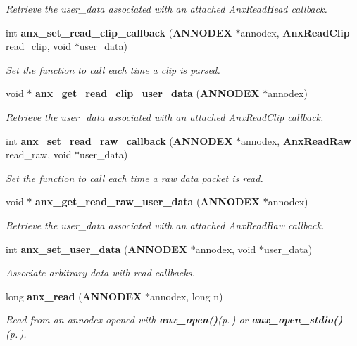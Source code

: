 \begin{CompactItemize}
\begin{CompactList}\small\item\em Retrieve the user\_\-data associated with an attached Anx\-Read\-Head callback. \item\end{CompactList}\item 
int {\bf anx\_\-set\_\-read\_\-clip\_\-callback} ({\bf ANNODEX} $\ast$annodex, {\bf Anx\-Read\-Clip} read\_\-clip, void $\ast$user\_\-data)
\begin{CompactList}\small\item\em Set the function to call each time a clip is parsed. \item\end{CompactList}\item 
void $\ast$ {\bf anx\_\-get\_\-read\_\-clip\_\-user\_\-data} ({\bf ANNODEX} $\ast$annodex)
\begin{CompactList}\small\item\em Retrieve the user\_\-data associated with an attached Anx\-Read\-Clip callback. \item\end{CompactList}\item 
int {\bf anx\_\-set\_\-read\_\-raw\_\-callback} ({\bf ANNODEX} $\ast$annodex, {\bf Anx\-Read\-Raw} read\_\-raw, void $\ast$user\_\-data)
\begin{CompactList}\small\item\em Set the function to call each time a raw data packet is read. \item\end{CompactList}\item 
void $\ast$ {\bf anx\_\-get\_\-read\_\-raw\_\-user\_\-data} ({\bf ANNODEX} $\ast$annodex)
\begin{CompactList}\small\item\em Retrieve the user\_\-data associated with an attached Anx\-Read\-Raw callback. \item\end{CompactList}\item 
int {\bf anx\_\-set\_\-user\_\-data} ({\bf ANNODEX} $\ast$annodex, void $\ast$user\_\-data)
\begin{CompactList}\small\item\em Associate arbitrary data with read callbacks. \item\end{CompactList}\item 
long {\bf anx\_\-read} ({\bf ANNODEX} $\ast$annodex, long n)
\begin{CompactList}\small\item\em Read from an annodex opened with {\bf anx\_\-open()}{\rm (p.\,\pageref{anx__general_8h_a3})} or {\bf anx\_\-open\_\-stdio()}{\rm (p.\,\pageref{anx__general_8h_a4})}. \item\end{CompactList}\item 

\end{CompactItemize}
